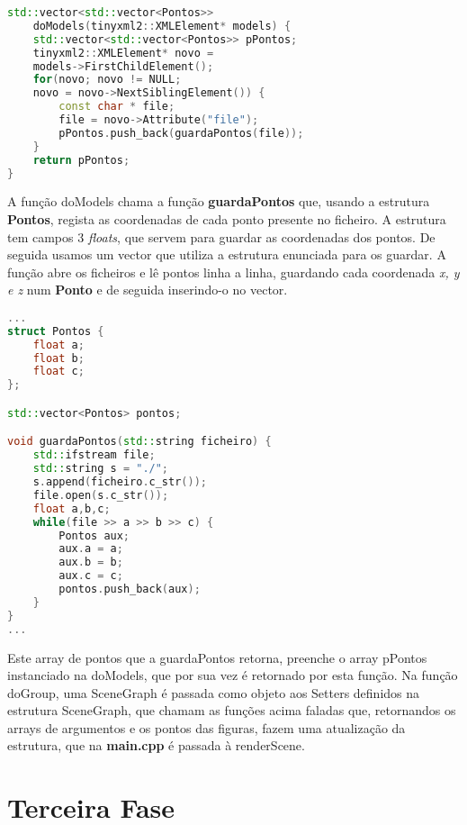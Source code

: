 \documentclass{article}
\begin{document}
\begin{file}
	\begin{lstlisting}[language=C++]
std::vector<std::vector<Pontos>> 
	doModels(tinyxml2::XMLElement* models) {
    std::vector<std::vector<Pontos>> pPontos;
    tinyxml2::XMLElement* novo = 
	models->FirstChildElement();
    for(novo; novo != NULL; 
	novo = novo->NextSiblingElement()) {
        const char * file;
        file = novo->Attribute("file");
        pPontos.push_back(guardaPontos(file));
    }
    return pPontos;
}
	\end{lstlisting}
\end{file}
	
A função doModels chama a função \textbf{guardaPontos} que, usando a estrutura \textbf{Pontos}, regista as coordenadas de cada ponto presente no ficheiro. A estrutura tem campos 3 \textit{floats}, que servem para guardar as coordenadas dos pontos. De seguida usamos um vector que utiliza a estrutura enunciada para os guardar.
A função abre os ficheiros e lê pontos linha a linha, guardando cada coordenada \textit{x, y e z} num \textbf{Ponto} e de seguida inserindo-o no vector.

\begin{file}
	\begin{lstlisting}[language=C++]
...
struct Pontos {
    float a;
    float b;
    float c;
};

std::vector<Pontos> pontos;

void guardaPontos(std::string ficheiro) {
	std::ifstream file;
	std::string s = "./";
	s.append(ficheiro.c_str());
	file.open(s.c_str());
	float a,b,c;
	while(file >> a >> b >> c) {
		Pontos aux;
		aux.a = a;
		aux.b = b;
		aux.c = c;
		pontos.push_back(aux);
	}
}
...
	\end{lstlisting}
\end{file}

Este array de pontos que a guardaPontos retorna, preenche o array pPontos instanciado na doModels, que por sua vez é retornado por esta função. Na função doGroup, uma SceneGraph é passada como objeto aos Setters definidos na estrutura SceneGraph, que chamam as funções acima faladas que, retornandos os arrays de argumentos e os pontos das figuras, fazem uma atualização da estrutura, que na \textbf{main.cpp} é passada à renderScene.
\newpage

\section{Terceira Fase}
\end{document}
